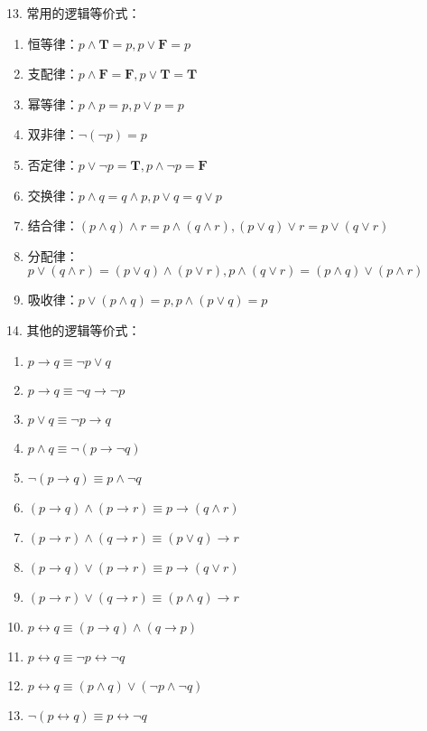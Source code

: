 \documentclass[normal,cyan]{elegantnote}
\begin{document}
13. 常用的逻辑等价式：
\begin{enumerate}[1)]
    \item 恒等律：$p\wedge \mathbf{T} = p,p\vee \mathbf{F} = p$
    \item 支配律：$p \wedge \mathbf{F} = \mathbf{F},p \vee \mathbf{T} = \mathbf{T}$
    \item 幂等律：$p \wedge p = p,p \vee p = p$
    \item 双非律：$\neg(\neg p) = p$
    \item 否定律：$p \vee \neg p = \mathbf{T},p \wedge \neg p = \mathbf{F}$
    \item 交换律：$p\wedge q = q \wedge p, p \vee q = q \vee p$
    \item 结合律：$(p\wedge q)\wedge r = p \wedge (q \wedge r),(p\vee q) \vee r=p\vee(q\vee r)$
    \item 分配律：$p\vee(q\wedge r) = (p\vee q)\wedge(p\vee r),p\wedge(q\vee r) = (p\wedge q)\vee(p\wedge r)$
    \item 吸收律：$p\vee(p\wedge q) = p,p\wedge(p\vee q) = p$
\end{enumerate}

14. 其他的逻辑等价式：
\begin{enumerate}[1)]
    \item $p \to q \equiv \neg p \vee q$
    \item $p \to q \equiv \neg q \to \neg p$
    \item $p \vee q \equiv \neg p \to q$
    \item $p \wedge q \equiv \neg\left(p \to \neg q\right)$
    \item $\neg \left(p \to q\right) \equiv p \wedge \neg q$
    \item $(p \rightarrow q) \wedge(p \rightarrow r) \equiv p \rightarrow(q \wedge r)$
    \item $(p \rightarrow r) \wedge(q \rightarrow r) \equiv(p \vee q) \rightarrow r$
    \item $(p \rightarrow q) \vee(p \rightarrow r) \equiv p \rightarrow(q \vee r)$
    \item $(p \rightarrow r) \vee(q \rightarrow r) \equiv(p \wedge q) \rightarrow r$
    \item $p \leftrightarrow q \equiv(p \rightarrow q) \wedge(q \rightarrow p)$
    \item $p \leftrightarrow q \equiv \neg p \leftrightarrow \neg q$
    \item $p \leftrightarrow q \equiv(p \wedge q) \vee(\neg p \wedge \neg q)$
    \item $\neg(p \leftrightarrow q) \equiv p \leftrightarrow \neg q$
\end{enumerate}
\end{document}
